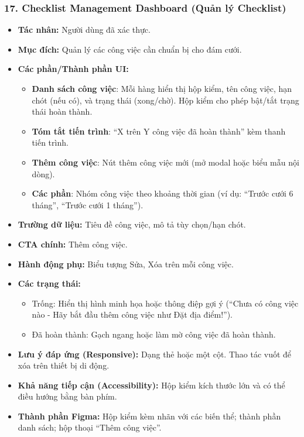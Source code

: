 \documentclass[11pt,a4paper]{article}
\begin{document}
\subsubsection{17. Checklist Management Dashboard (Quản lý Checklist)}
\begin{itemize}
    \item \textbf{Tác nhân:} Người dùng đã xác thực.
    \item \textbf{Mục đích:} Quản lý các công việc cần chuẩn bị cho đám cưới.
    \item \textbf{Các phần/Thành phần UI:}
    \begin{itemize}
        \item \textbf{Danh sách công việc}: Mỗi hàng hiển thị hộp kiểm, tên công việc, hạn chót (nếu có), và trạng thái (xong/chờ). Hộp kiểm cho phép bật/tắt trạng thái hoàn thành.
        \item \textbf{Tóm tắt tiến trình}: ``X trên Y công việc đã hoàn thành'' kèm thanh tiến trình.
        \item \textbf{Thêm công việc}: Nút thêm công việc mới (mở modal hoặc biểu mẫu nội dòng).
        \item \textbf{Các phần}: Nhóm công việc theo khoảng thời gian (ví dụ: ``Trước cưới 6 tháng'', ``Trước cưới 1 tháng'').
    \end{itemize}
    \item \textbf{Trường dữ liệu:} Tiêu đề công việc, mô tả tùy chọn/hạn chót.
    \item \textbf{CTA chính:} Thêm công việc.
    \item \textbf{Hành động phụ:} Biểu tượng Sửa, Xóa trên mỗi công việc.
    \item \textbf{Các trạng thái:}
    \begin{itemize}
        \item Trống: Hiển thị hình minh họa hoặc thông điệp gợi ý (``Chưa có công việc nào - Hãy bắt đầu thêm công việc như Đặt địa điểm!'').
        \item Đã hoàn thành: Gạch ngang hoặc làm mờ công việc đã hoàn thành.
    \end{itemize}
    \item \textbf{Lưu ý đáp ứng (Responsive):} Dạng thẻ hoặc một cột. Thao tác vuốt để xóa trên thiết bị di động.
    \item \textbf{Khả năng tiếp cận (Accessibility):} Hộp kiểm kích thước lớn và có thể điều hướng bằng bàn phím.
    \item \textbf{Thành phần Figma:} Hộp kiểm kèm nhãn với các biến thể; thành phần danh sách; hộp thoại ``Thêm công việc''.
\end{itemize}
\end{document}
